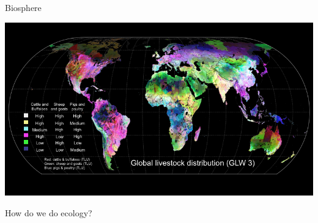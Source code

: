 \documentclass[12pt]{beamer}
\begin{document}
\begin{frame}

	\begin{flushright}
	  \Large \textcolor{boss2}{Biosphere} 
	\end{flushright}

  \begin{center}
    \includegraphics[width=\textwidth]{figs/globalRisk.png}
  \end{center}
  \let\thefootnote\relax{}

\end{frame}


















\begin{frame}

  {\Large  \textcolor{boss1}{ How do we do ecology?}} \\

\end{frame}
\end{document}
